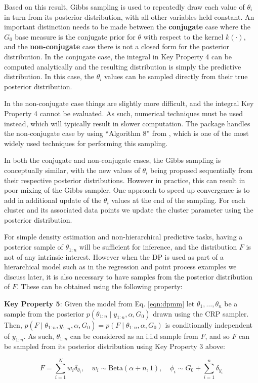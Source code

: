 \documentclass[nojss]{jss}
\begin{document}
Based on this result, Gibbs sampling is used to repeatedly draw each value of $\theta_i$ in turn from its posterior distribution, with all other variables held constant. An important distinction needs to be made between the \textbf{conjugate} case where the $G_0$ base measure is the conjugate prior for $\theta$ with respect to the kernel $k(\cdot)$, and the \textbf{non-conjugate} case there is not a closed form for the posterior distribution. In the conjugate case, the integral in Key Property 4 can be computed analytically and the resulting distribution is simply the predictive distribution. In this case, the $\theta_i$ values can be sampled directly from their true posterior distribution.

In the non-conjugate case things are slightly more difficult, and the integral Key Property 4 cannot be evaluated. As such, numerical techniques must be used instead, which will typically result in slower computation. The  package handles the non-conjugate case by using ``Algorithm 8'' from \citep{neal_markov_2000}, which is one of the most widely used techniques for performing this sampling.

In both the conjugate and non-conjugate cases, the Gibbs sampling is conceptually similar, with the new values of $\theta_i$ being proposed sequentially from their respective posterior distributions. However in practice, this can result in poor mixing of the Gibbs sampler. One approach to speed up convergence is to add in additional update of the $\theta_i$ values at the end of the sampling. For each cluster and its associated data points we  update the cluster parameter using the posterior distribution.

For simple density estimation and non-hierarchical predictive tasks, having a posterior sample of $\theta_{1:n}$ will be sufficient for inference, and the distribution $F$ is not of any intrinsic interest. However when the DP is used as part of a hierarchical model such as in the regression and point process examples we discuss later, it is also necessary to have samples from the posterior distribution of $F$. These can be obtained using the following property:

\begin{tcolorbox}
\textbf{Key Property 5}: Given the model from Eq. \eqref{eqn:dpmm} let $\theta_1,\ldots,\theta_n$  be a sample from the posterior $p(\theta_{1:n} \mid y_{1:n},\alpha,G_0)$ drawn using the CRP sampler. Then, $p(F \mid \theta_{1:n},y_{1:n},\alpha,G_0) = p(F\mid\theta_{1:n},\alpha,G_0)$ is conditionally independent of $y_{1:n}$. As such, $\theta_{1:n}$ can be considered as an i.i.d sample from $F$, and so $F$ can be sampled from its posterior distribution using Key Property 3 above:

$$F = \sum_{i=1}^N w_i \delta_{\theta_i}, \quad w_i \sim \text{Beta}(\alpha+n,1), \quad \phi_i \sim G_0 + \sum_{i=1}^n \delta_{y_i}$$
\end{tcolorbox}
\end{document}
